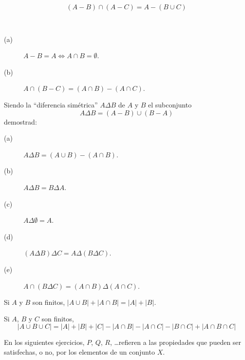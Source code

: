 \begin{ejercicio}
    \begin{equation*}
        (A-B)\cap(A-C) = A-(B\cup C)
    \end{equation*}
\end{ejercicio}

\begin{ejercicio}
    \ 
    \begin{description}
        \item [(a)] $A-B=A\Longleftrightarrow A\cap B = \emptyset $.
        \item [(b)] $A\cap(B-C) = (A\cap B) - (A \cap C)$.
    \end{description}
\end{ejercicio}

\begin{ejercicio}
    Siendo la ``diferencia simétrica'' $A\Delta B$ de $A$ y $B$ el subconjunto
    \begin{equation*}
        A\Delta B = (A-B)\cup (B-A)
    \end{equation*}
    demostrad:
    \begin{description}
        \item [(a)] $A\Delta B = (A\cup B) - (A \cap B)$.
        \item [(b)] $A\Delta B = B\Delta A$.
        \item [(c)] $A\Delta \emptyset = A$.
        \item [(d)] $(A\Delta B)\Delta C = A\Delta(B\Delta C)$.
        \item [(e)] $A\cap (B\Delta C) = (A\cap B)\Delta (A\cap C)$.
    \end{description}
\end{ejercicio}

\begin{ejercicio}
    Si $A$ y $B$ son finitos, $|A\cup B| + |A\cap B| = |A| + |B|$.
\end{ejercicio}

\begin{ejercicio}
    Si $A$, $B$ y $C$ son finitos,
    \begin{equation*}
        |A\cup B \cup C| = |A| + |B| + |C| - |A\cap B| - |A\cap C| - |B\cap C| + |A\cap B\cap C|
    \end{equation*}
\end{ejercicio}

\noindent
En los siguientes ejercicios, $P$, $Q$, $R$, \ldots refieren a las propiedades que pueden ser satisfechas, o no, por los elementos de un conjunto $X$.

